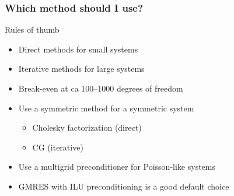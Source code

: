 \begin{frame}
  \frametitle{Which method should I use?}

  Rules of thumb
  \begin{itemize}
  \item
    Direct methods for small systems
  \item
    Iterative methods for large systems
  \item
    Break-even at ca 100--1000 degrees of freedom
  \item
    Use a symmetric method for a symmetric system
    \begin{itemize}
    \item
      Cholesky factorization (direct)
    \item
      CG (iterative)
    \end{itemize}
  \item
    Use a multigrid preconditioner for Poisson-like systems
  \item
    GMRES with ILU preconditioning is a good default choice
  \end{itemize}

\end{frame}

